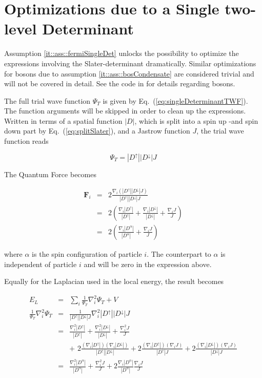 \section{Optimizations due to a Single two-level Determinant}
\label{sec:optSingleSlater}

Assumption \ref{it::ass::fermiSingleDet} unlocks the possibility to optimize the expressions involving the Slater-determinant dramatically. Similar optimizations for bosons due to assumption \ref{it::ass::bosCondensate} are considered trivial and will not be covered in detail. See the code in \cite{libBorealisCode} for details regarding bosons.

The full trial wave function $\Psi_T$ is given by Eq.~(\ref{eq:singleDeterminantTWF}). The function arguments will be skipped in order to clean up the expressions. Written in terms of a spatial function $|D|$, which is split into a spin up  -and spin down part by Eq.~(\ref{eq:splitSlater}), and a Jastrow function $J$, the trial wave function reads

\newcommand{\PTd}{|D^\uparrow||D^\downarrow|J}
\newcommand{\Du}{|D^\uparrow|}
\newcommand{\Dd}{|D^\downarrow|}
\newcommand{\Da}{|D^\alpha|}

\begin{equation}
 \Psi_T = \PTd
\end{equation}

The Quantum Force becomes

\begin{eqnarray}
 \mathbf{F}_i &=& 2\frac{\nabla_i\left(\PTd\right)}{\PTd} \nonumber\\
     &=& 2\left(\frac{\nabla_i\Du}{\Du} + \frac{\nabla_i\Dd}{\Dd} + \frac{\nabla_i J}{J}\right) \nonumber \\
     &=& 2\left(\frac{\nabla_i\Da}{\Da} + \frac{\nabla_i J}{J}\right)
\end{eqnarray}

where $\alpha$ is the spin configuration of particle $i$. The counterpart to $\alpha$ is independent of particle $i$ and will be zero in the expression above.

Equally for the Laplacian used in the local energy, the result becomes

\begin{eqnarray}
 E_L &=& \sum_i \frac{1}{\Psi_T}\nabla^2_i \Psi_T + V \label{eq:localEsum}\\
  \frac{1}{\Psi_T}\nabla^2_i\Psi_T &=&  \frac{1}{\PTd}\nabla^2_i \PTd \nonumber\\
  &=& \frac{\nabla^2_i \Du}{\Du} + \frac{\nabla^2_i \Dd}{\Dd} + \frac{\nabla^2_i J}{J} \nonumber\\
  && +\,\, 2\frac{\left(\nabla_i\Du\right)\left(\nabla_i\Dd\right)}{\Du\Dd} + 2 \frac{\left(\nabla_i\Du\right)\left(\nabla_i J\right)}{\Du J} + 2 \frac{\left(\nabla_i\Dd\right)\left(\nabla_i J\right)}{\Dd J} \nonumber\\
  &=& \frac{\nabla^2_i \Da}{\Da} + \frac{\nabla^2_i J}{J} + 2\frac{\nabla_i\Da}{\Da} \frac{\nabla_i J}{J}
\end{eqnarray}

